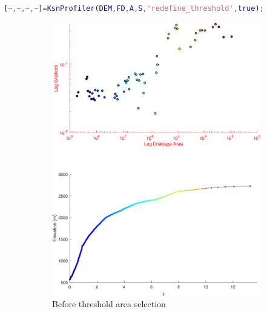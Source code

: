  \begin{lstlisting}[language=Matlab]
% To redefine minimum threshold area for each stream chosen stream segment individually:
[~,~,~,~]=KsnProfiler(DEM,FD,A,S,'redefine_threshold',true);
\end{lstlisting}

\begin{figure}[H]
	\centering
	\begin{subfigure}{.5\textwidth}
		\centering
		\includegraphics[width=.8\linewidth]{PNGs/B92_StreamThresh_9_prePick.png}
		\caption{Before threshold area selection}
		\label{fig:TSsub1}
	\end{subfigure}%
	\begin{subfigure}{.5\textwidth}
		\centering

\end{subfigure}
\end{figure}
